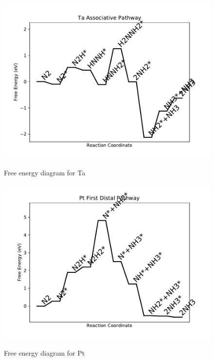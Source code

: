 \documentclass{article}
\begin{document}
\begin{figure}
\includegraphics[width=1\linewidth]{data/plots/Ta_associative.pdf}
\label{fig:Ta_associative}
\caption{Free energy diagram for Ta}
\end{figure}

\begin{figure}
\includegraphics[width=1\linewidth]{data/plots/Pt_distal_1.pdf}
\label{fig:Pt_distal_1}
\caption{Free energy diagram for Pt}
\end{figure}
\end{document}
